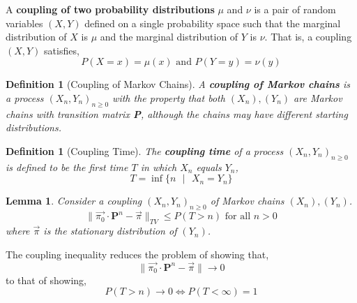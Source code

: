 \documentclass{tufte-handout}
\newtheorem{lem}[thm]{Lemma}
\newtheorem{defn}[thm]{Definition}
\begin{document}
  \begin{marginfigure}
    A \textbf{coupling of two probability distributions} $\mu$ and $\nu$ is a pair of random variables $(X, Y )$ defined on a single probability space such that the marginal distribution of $X$ is $\mu$ and the marginal distribution of $Y$ is $\nu$.
    \vphantom{.}
    \noindent That is, a coupling $(X, Y)$ satisfies,
    \[P(X = x) = \mu(x) \text{ and } P(Y = y) = \nu(y)\]
  \end{marginfigure}

  \begin{defn}[Coupling of Markov Chains]
    A \textbf{coupling of Markov chains} is a process $(X_n, Y_n)_{n \geq 0}$ with the property that both $(X_n), (Y_n)$ are Markov chains with transition matrix \textbf{P}, although the chains may have different starting distributions.
  \end{defn}

  \begin{defn}[Coupling Time]
    The \textbf{coupling time} of a process $(X_n, Y_n)_{n \geq 0}$ is defined to be the first time $T$ in which $X_n$ equals $Y_n$,
    \[T = \inf\{n \text{ $|$ } X_n = Y_n\}\]
  \end{defn}

  \begin{lem}
    Consider a coupling $(X_n, Y_n)_{n \geq 0}$ of Markov chains $(X_n), (Y_n)$.
    \[\|\Vec{\pi_0} \cdot \boldsymbol{P}^n - \Vec{\pi}\|_{TV} \leq P(T > n) \text{ for all $n > 0$}\]
    \noindent where $\Vec{\pi}$ is the stationary distribution of $(Y_n)$.
  \end{lem}

  \begin{marginfigure}
    The coupling inequality reduces the problem of showing that,
    \[\|\Vec{\pi_0} \cdot \boldsymbol{P}^n - \Vec{\pi}\| \rightarrow 0\]
    \noindent to that of showing,
    \[P(T > n) \rightarrow 0 \iff P(T < \infty) = 1\]
  \end{marginfigure}
\end{document}
